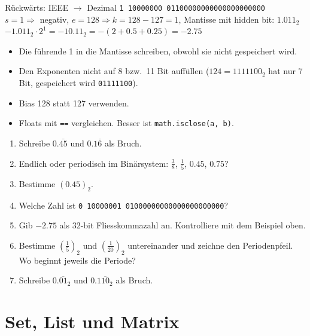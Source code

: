 \begin{beispiel}{Rückwärts: IEEE $\to$ Dezimal}
  \texttt{1 10000000 01100000000000000000000}\\
  $s = 1 \Rightarrow$ negativ, \; $e = 128 \Rightarrow k = 128 - 127 = 1$, \;
  Mantisse mit hidden bit: $1.011_2$\\
  $-1.011_2 \cdot 2^1 = -10.11_2 = -(2 + 0.5 + 0.25) = \mathbf{-2.75}$
\end{beispiel}

\begin{fehler}
  \begin{itemize}[nosep]
    \item Die führende 1 in die Mantisse schreiben, obwohl sie nicht gespeichert wird.
    \item Den Exponenten nicht auf 8 bzw.\ 11 Bit auffüllen ($124 = 1111100_2$ hat nur 7 Bit,
          gespeichert wird \texttt{01111100}).
    \item Bias 128 statt 127 verwenden.
    \item Floats mit \texttt{==} vergleichen. Besser ist \texttt{math.isclose(a, b)}.
  \end{itemize}
\end{fehler}

\begin{minicheck}
  \begin{enumerate}[resume*=fragen01]
    \item Schreibe $0.\overline{45}$ und $0.1\overline{6}$ als Bruch.
    \item Endlich oder periodisch im Binärsystem: $\tfrac38$, \; $\tfrac15$, \; $0.45$, \; $0.75$?
    \item Bestimme $(0.45)_2$.
    \item Welche Zahl ist \texttt{0 10000001 01000000000000000000000}?
    \item Gib $-2.75$ als 32-bit Fliesskommazahl an. Kontrolliere mit dem Beispiel oben.
    \item Bestimme $(\tfrac15)_2$ und $(\tfrac1{20})_2$ untereinander und zeichne den
          Periodenpfeil. Wo beginnt jeweils die Periode?
    \item Schreibe $0.\overline{01}_2$ und $0.1\overline{10}_2$ als Bruch.
  \end{enumerate}
\end{minicheck}

\section{Set, List und Matrix}
\label{sec:01-mengen}

